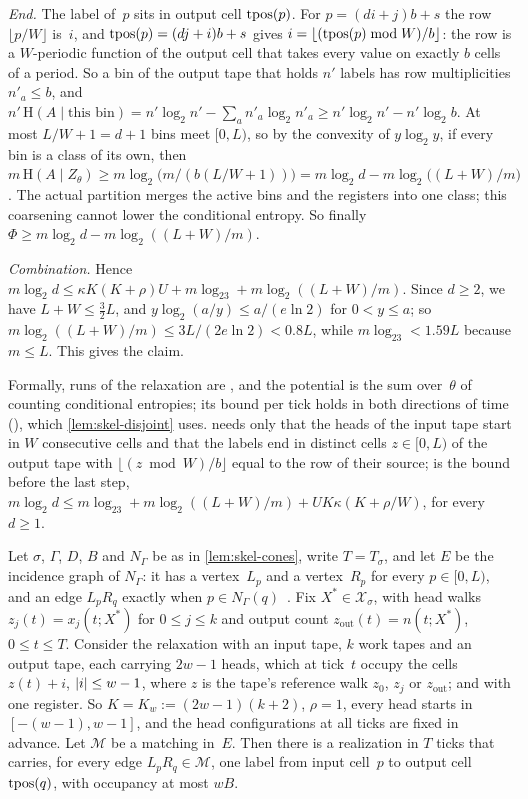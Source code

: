 \begin{outline}
\emph{End.} The label of~$p$ sits in output cell $\operatorname{tpos}(p)$. For $p=(di+j)b+s$ the row $\lfloor p/W\rfloor$ is~$i$,
and $\operatorname{tpos}(p)=(dj+i)b+s$ gives $i=\lfloor(\operatorname{tpos}(p)\bmod W)/b\rfloor$: the row is a $W$-periodic function of the output cell
that takes every value on exactly $b$ cells of a period. So a bin of the output tape that holds $n'$ labels has row
multiplicities $n'_a\le b$, and
$n'\,\mathrm H(A\mid\text{this bin})=n'\log_2n'-\sum_an'_a\log_2n'_a\ge n'\log_2n'-n'\log_2b$. At most $L/W+1=d+1$ bins meet
$[0,L)$, so by the convexity of $y\log_2y$, if every bin is a class of its own, then
$m\,\mathrm H(A\mid Z_\theta)\ge m\log_2\bigl(m/(b(L/W+1))\bigr)=m\log_2d-m\log_2\bigl((L+W)/m\bigr)$. The actual
partition merges the active bins and the registers into one class; this coarsening cannot lower the conditional entropy.
So finally $\Phi\ge m\log_2d-m\log_2((L+W)/m)$.

\emph{Combination.} Hence $m\log_2d\le\kappa K(K+\rho)U+m\log_23+m\log_2((L+W)/m)$. Since $d\ge2$, we have
$L+W\le\frac32L$, and $y\log_2(a/y)\le a/(e\ln2)$ for $0<y\le a$; so $m\log_2((L+W)/m)\le3L/(2e\ln2)<0.8L$, while
$m\log_23<1.59L$ because $m\le L$. This gives the claim.

Formally, runs of the relaxation are , and the potential is the sum over~$\theta$ of counting
conditional entropies; its bound per tick holds in both directions of time (), which
\cref{lem:skel-disjoint} uses.  needs only that the heads of the input tape start in $W$
consecutive cells and that the labels end in distinct cells $z\in[0,L)$ of the output tape with
$\lfloor(z\bmod W)/b\rfloor$ equal to the row of their source;  is the bound before
the last step, $m\log_2d\le m\log_23+m\log_2((L+W)/m)+UK\kappa(K+\rho/W)$, for every $d\ge1$.
\end{outline}

\begin{lemma}\label{lem:skel-matching}
Let $\sigma$, $\Gamma$, $D$, $B$ and $N_\Gamma$ be as in \cref{lem:skel-cones}, write $T=T_\sigma$, and let $E$ be the
incidence graph of $N_\Gamma$: it has a vertex~$L_p$ and a vertex~$R_p$ for every $p\in[0,L)$, and an edge $L_pR_q$
exactly when $p\in N_\Gamma(q)$~\cite[Definitions~2.3 and~3.2]{DirectedRecovery2026}. Fix $X^*\in\mathcal X_\sigma$,
with head walks $z_j(t)=x_j(t;X^*)$ for $0\le j\le k$ and output count $z_{\mathrm{out}}(t)=n(t;X^*)$, $0\le t\le T$.
Consider the relaxation with an input tape, $k$ work tapes and an output tape, each carrying $2w-1$ heads, which at
tick~$t$ occupy the cells $z(t)+i$, $\lvert i \rvert\le w-1$, where $z$ is the tape's reference walk $z_0$, $z_j$ or
$z_{\mathrm{out}}$; and with one register. So $K=K_w:=(2w-1)(k+2)$, $\rho=1$, every head starts in $[-(w-1),w-1]$, and
the head configurations at all ticks are fixed in advance. Let $\mathcal M$ be a matching in~$E$. Then there is a
realization in $T$ ticks that carries, for every edge $L_pR_q\in\mathcal M$, one label from input cell~$p$ to output
cell $\operatorname{tpos}(q)$, with occupancy at most $wB$.
\end{lemma}

